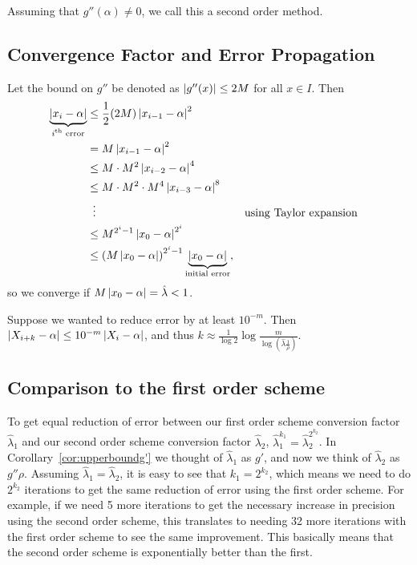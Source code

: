 \documentclass[12pt,letterpaper,DIV=11]{scrartcl}
\theoremstyle{plain}
\theoremstyle{definition}
\theoremstyle{remark}
\begin{document}
Assuming that $g''(\alpha) \neq 0$, we call this a second order method.

\subsection{Convergence Factor and Error Propagation}
Let the bound on $g''$ be denoted as $\left\lvert g''(x)\right\rvert \leq 2M$ for all $x \in I$.
Then \begin{align*}
  \underbrace{\abs{x_i - \alpha}}_\text{$i$\textsuperscript{th} error} &\leq \frac{1}{2} (2M) \abs{x_{i - 1} - \alpha}^2 \\
                                                                       &= M \abs{x_{i - 1} - \alpha}^2 \\
                                                                       &\leq M \cdot M^2 \abs{x_{i - 2} - \alpha}^4 \\
                                                                       &\leq M \cdot M^2 \cdot M^4 \abs{x_{i - 3} - \alpha}^8 \\
                                                                       &\vdotswithin{\leq} && \text{using Taylor expansion} \\
                                                                       &\leq M^{2^i - 1} \abs{x_0 - \alpha}^{2^i} \\
                                                                       &\leq {(M \abs{x_0 - \alpha})}^{2^i - 1} \underbrace{\abs{x_0 - \alpha}}_\text{initial error},
\end{align*}
so we converge if $M \left\lvert x_0 - \alpha\right\rvert = \hat{\lambda} < 1$.

Suppose we wanted to reduce error by at least $10^{-m}$.
Then $\left\lvert X_{i + k} - \alpha\right\rvert \leq 10^{-m} \left\lvert X_i - \alpha\right\rvert$, and thus $k \approx \frac{1}{\log 2} \log \frac{m}{\log \left( \hat{\lambda} \frac{1}{\rho} \right)}$.

\subsection{Comparison to the first order scheme}
To get equal reduction of error between our first order scheme conversion factor $\hat{\lambda}_1$ and our second order scheme conversion factor $\hat{\lambda}_2$, $\hat{\lambda}_1^{k_1} = \hat{\lambda}_2^{2^{k_2}}$.
In Corollary~\ref{cor:upperboundg'} we thought of $\hat{\lambda}_1$ as $g'$, and now we think of $\hat{\lambda}_2$ as $g'' \rho$.
Assuming $\hat{\lambda}_1 = \hat{\lambda}_2$, it is easy to see that $k_1 = 2^{k_2}$, which means we need to do $2^{k_2}$ iterations to get the same reduction of error using the first order scheme.
For example, if we need 5 more iterations to get the necessary increase in precision using the second order scheme, this translates to needing 32 more iterations with the first order scheme to see the same improvement.
This basically means that the second order scheme is exponentially better than the first.
\end{document}
